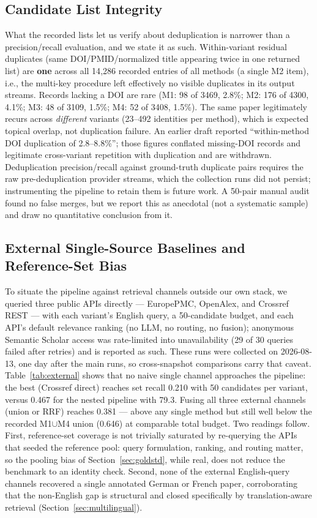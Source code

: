 \documentclass[nonacm,sigconf]{acmart}
\begin{document}
\subsection{Candidate List Integrity}
\label{sec:integrity}

What the recorded lists let us verify about deduplication is narrower
than a precision/recall evaluation, and we state it as such. Within-variant
residual duplicates (same DOI/PMID/normalized title appearing twice in one
returned list) are \textbf{one} across all 14{,}286 recorded entries of
all methods (a single M2 item), i.e., the multi-key procedure left
effectively no visible duplicates in its output streams. Records lacking a
DOI are rare (M1: 98 of 3469, 2.8\%; M2: 176 of 4300, 4.1\%; M3: 48 of
3109, 1.5\%; M4: 52 of 3408, 1.5\%). The same paper legitimately recurs
across \emph{different} variants (23--492 identities per method), which is
expected topical overlap, not duplication failure. An earlier
draft reported ``within-method DOI duplication of 2.8--8.8\%''; those
figures conflated missing-DOI records and legitimate cross-variant
repetition with duplication and are withdrawn. Deduplication
precision/recall against ground-truth duplicate pairs requires the raw
pre-deduplication provider streams, which the collection runs did not
persist; instrumenting the pipeline to retain them is future work. A
50-pair manual audit found no false merges, but we report this as
anecdotal (not a systematic sample) and draw no quantitative conclusion
from it.

\subsection{External Single-Source Baselines and Reference-Set Bias}
\label{sec:external}

To situate the pipeline against retrieval channels outside our own stack,
we queried three public APIs directly --- EuropePMC, OpenAlex, and
Crossref REST --- with each variant's English query, a 50-candidate
budget, and each API's default relevance ranking (no LLM, no routing, no
fusion); anonymous Semantic Scholar access was rate-limited into
unavailability (29 of 30 queries failed after retries) and is reported as
such. These runs were collected on 2026-08-13, one day after the main
runs, so cross-snapshot comparisons carry that caveat.
Table~\ref{tab:external} shows that no naive single channel approaches
the pipeline: the best (Crossref direct) reaches set recall 0.210 with 50
candidates per variant, versus 0.467 for the nested pipeline with 79.3.
Fusing all three external channels (union or RRF) reaches 0.381 --- above
any single method but still well below the recorded M1$\cup$M4 union
(0.646) at comparable total budget. Two readings follow. First,
reference-set coverage is not trivially saturated by re-querying the APIs
that seeded the reference pool: query formulation, ranking, and routing
matter, so the pooling bias of Section~\ref{sec:goldstd}, while real, does
not reduce the benchmark to an identity check. Second, none of the external
English-query channels recovered a single annotated German or French
paper, corroborating that the non-English gap is structural and closed
specifically by translation-aware retrieval
(Section~\ref{sec:multilingual}).
\end{document}
